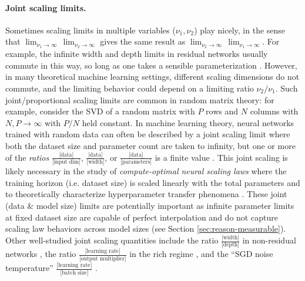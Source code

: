 \paragraph{Joint scaling limits.}

Sometimes scaling limits in multiple variables ($\nu_1,\nu_2$) play nicely, in the sense that $\displaystyle \lim_{\nu_1 \to \infty}\,\lim_{\nu_2 \to \infty}$ gives the same result as
$\displaystyle \lim_{\nu_2 \to \infty}\,\lim_{\nu_1 \to \infty}$.
For example, the infinite width and depth limits in residual networks usually commute in this way, so long as one takes a sensible parameterization \citep{hayou2023width}.
However, in many theoretical machine learning settings, different scaling dimensions do not commute, and the limiting behavior could depend on a limiting ratio $\nu_2 / \nu_1$.
Such joint/proportional scaling limits are common in random matrix theory: for example, consider the SVD of a random matrix with $P$ rows and $N$ columns with $N,P \to \infty$ with $P/N$ held constant.
In machine learning theory, neural networks trained with random data can often be described by a joint scaling limit where both the dataset size and parameter count are taken to infinity, but one or more of the \textit{ratios}
$\frac{\text{[data]}}{\text{[input dim]}}$, $\frac{\text{[data]}}{\text{[width]}}$, or $\frac{\text{[data]}}{\text{[parameters]}}$
is a finite value \citep{seung1992statistical,saad1995exact,zdeborova2016statistical,li2021statistical,maillard2024bayes,martin2024impact,barbier2025statistical}.
This joint scaling is likely necessary in the study of \textit{compute-optimal neural scaling laws} where the training horizon (i.e. dataset size) is scaled linearly with the total parameters \citep{hoffmann:2022-chinchilla} and to theoretically characterize hyperparameter transfer phenomena \citep{bordelon2025deep}. These joint (data \& model size) limits are potentially important as infinite parameter limits at fixed dataset size are capable of perfect interpolation and do not capture scaling law behaviors across model sizes (see Section \ref{sec:reason-measurable}).
Other well-studied joint scaling quantities include the ratio
$\frac{\text{[width]}}{\text{[depth]}}$
in non-residual networks \citep{hanin2019finite, li2022neural, noci2023shaped, hanin2025global}, the ratio
$\frac{\text{[learning rate]}}{\text{[output multiplier]}}$
in the rich regime \citep{atanasovoptimization}, and the ``SGD noise temperature''
$\frac{\text{[learning rate]}}{\text{[batch size]}}$ \citep{mandt2017stochastic,jastrzkebski2017three}.

